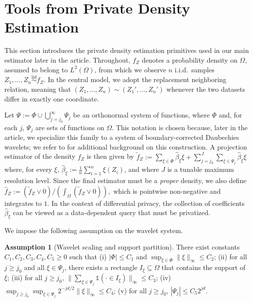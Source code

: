 \documentclass{article}
\newcommand{\1}{\mathds{1}}
\newcommand{\iid}{\stackrel{\text{iid}}{\sim}}
\theoremstyle{plain}
\theoremstyle{definition}
\newtheorem{assumption}{Assumption}
\theoremstyle{remark}
\begin{document}
\section{Tools from Private Density Estimation}
\label{sec:density_estimation_wasserstein}

This section introduces the private density estimation primitives used in our main estimator later in the article. Throughout, $f_Z$ denotes a probability density on $\Omega$, assumed to belong to $L^2(\Omega)$, from which we observe $n$ i.i.d.\ samples $Z_1, \dots, Z_n \iid f_Z$. In the central model, we adopt the replacement neighboring relation, meaning that $(Z_1, \dots, Z_n) \sim (Z_1', \dots, Z_n')$ whenever the two datasets differ in exactly one coordinate.

Let
$
    \Psi := \Phi \cup \bigcup_{j = j_0 }^{\infty} \Psi_j
$
be an orthonormal system of functions, where $\Phi$ and, for each $j$, $\Psi_j$ are sets of functions on $\Omega$. This notation is chosen because, later in the article, we specialize this family to a system of boundary-corrected Daubechies wavelets; we refer to \cite{Manole2024Plugin} for additional background on this construction.
A projection estimator of the density $f_Z$ is then given by
$
    \tilde{f}_Z := \sum_{\xi \in \Phi} \hat{\beta}_{\xi} \xi + \sum_{j = j_0 }^{J} \sum_{\xi \in \Psi_j} \hat{\beta}_{\xi} \xi
$
where, for every $\xi$, $\hat{\beta}_{\xi} := \frac{1}{n} \sum_{i=1}^n \xi(Z_i)$,
and where $J$ is a tunable maximum resolution level. Since the final estimator must be a \emph{proper} density, we also define
$
    \hat{f}_Z :=(\tilde{f}_Z \vee 0) / (\int_{\Omega} (\tilde{f}_Z \vee 0)),
$
which is pointwise non-negative and integrates to $1$.
In the context of differential privacy, the collection of coefficients $\hat{\beta}_{\xi}$ can be viewed as a data-dependent query that must be privatized.


We impose the following assumption on the wavelet system.
\begin{assumption}[Wavelet scaling and support partition]
\label{ass:wavelet_scaling_support}
   There exist constants $C_1, C_2, C_3, C_4, C_5 \geq 0$ such that
   (i) $|\Phi| \leq C_1$ and $\sup_{\xi \in \Phi}  \| \xi \|_{\infty} \leq C_2$;
(ii) for all $j \geq j_0$ and all $\xi \in \Psi_j$, there exists a rectangle $I_{\xi} \subseteq \Omega$ that contains the support of $\xi$;
(iii) for all $j \geq j_0$, $\| \sum_{\xi \in \Psi_j} \1 (\cdot \in I_{\xi})\|_{\infty} \leq C_3$;
(iv) $\sup_{j \geq j_0 } \sup_{\xi \in \Psi_j} 2^{-jd/2} \| \xi \|_{\infty} \leq C_4$;
(v) for all $j \geq j_0$, $|\Psi_j| \leq C_5 2^{j d}$.
\end{assumption}
\end{document}
